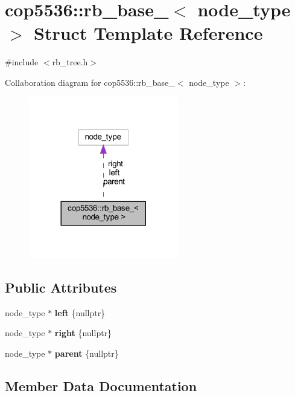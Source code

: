 \section{cop5536\+::rb\+\_\+base\+\_\+$<$ node\+\_\+type $>$ Struct Template Reference}
\label{structcop5536_1_1rb__base__}


{\ttfamily \#include $<$rb\+\_\+tree.\+h$>$}



Collaboration diagram for cop5536\+::rb\+\_\+base\+\_\+$<$ node\+\_\+type $>$\+:
\nopagebreak
\begin{figure}[H]
\begin{center}
\leavevmode
\includegraphics[width=185pt]{structcop5536_1_1rb__base____coll__graph}
\end{center}
\end{figure}
\subsection*{Public Attributes}
\begin{DoxyCompactItemize}
\item 
node\+\_\+type $\ast$ \textbf{ left} \{nullptr\}
\item 
node\+\_\+type $\ast$ \textbf{ right} \{nullptr\}
\item 
node\+\_\+type $\ast$ \textbf{ parent} \{nullptr\}
\end{DoxyCompactItemize}


\subsection{Member Data Documentation}
\mbox{\label{structcop5536_1_1rb__base___a03eb25ff786b255fc16e8e81b5eda943}} 
